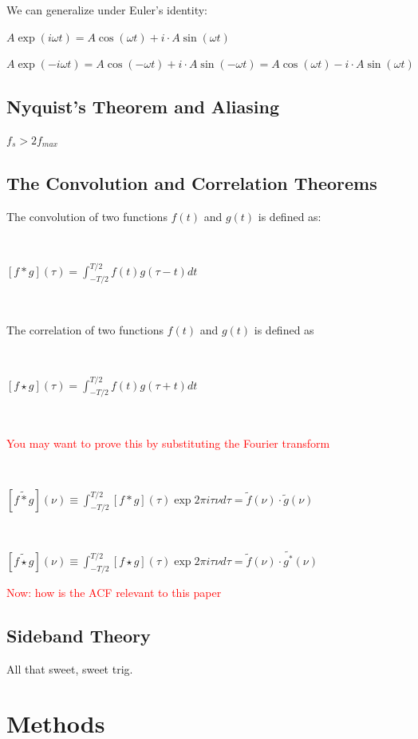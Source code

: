 \documentclass[a4paper]{article}
\begin{document}
We can generalize under Euler's identity:

$A\exp(i \omega t) = A \cos(\omega t) + i \cdot A \sin(\omega t)$

$A\exp(-i \omega t) = A \cos(-\omega t) + i \cdot A \sin(-\omega t) = A \cos(\omega t) - i \cdot A \sin(\omega t)$

\subsection{Nyquist's Theorem and Aliasing}

$f_s > 2 f_{max}$

\subsection{The Convolution and Correlation Theorems}

The convolution of two functions $f(t)$ and $g(t)$ is defined as:

\

$[f * g](\tau) = \int_{-T / 2}^{T / 2} f(t) g(\tau - t) dt$

\

The correlation of two functions $f(t)$ and $g(t)$ is defined as

\

$[f \star g](\tau) = \int_{-T / 2}^{T / 2} f(t) g(\tau + t) dt$

\

\textcolor{red}{You may want to prove this by substituting the Fourier transform}

\

$[\tilde{f * g}](\nu) \equiv \int_{-T / 2}^{T / 2}[f * g](\tau) \exp{2 \pi i \tau \nu} d \tau = \tilde{f}(\nu) \cdot \tilde{g}(\nu)$

\

$[\tilde{f \star g}](\nu) \equiv \int_{-T / 2}^{T / 2}[f \star g](\tau) \exp{2 \pi i \tau \nu} d \tau = \tilde{f}(\nu) \cdot \tilde{g^*}(\nu)$

\textcolor{red}{Now: how is the ACF relevant to this paper}

\subsection{Sideband Theory}

All that sweet, sweet trig.

\section{Methods}
\end{document}

